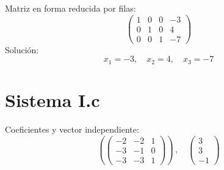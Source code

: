 \documentclass{article}
\begin{document}
Matriz en forma reducida por filas:
\[\begin{pmatrix}1 & 0 & 0 & -3 \\ 0 & 1 & 0 & 4 \\ 0 & 0 & 1 & -7\end{pmatrix}\]
Solución:
\[x_1 = -3,\quad x_2 = 4,\quad x_3 = -7\]
\section*{Sistema I.c}
Coeficientes y vector independiente:
\[\left( \begin{pmatrix}-2 & -2 & 1 \\ -3 & -1 & 0 \\ -3 & -3 & 1\end{pmatrix}\right) \,, \quad \begin{pmatrix}3 \\ 3 \\ -1\end{pmatrix}\]
\end{document}
